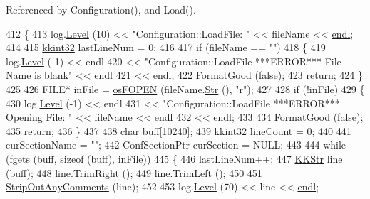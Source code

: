 Referenced by Configuration(), and Load().


\begin{DoxyCode}
412 \{
413   log.\hyperlink{class_k_k_b_1_1_run_log_a32cf761d7f2e747465fd80533fdbb659}{Level} (10) << \textcolor{stringliteral}{"Configuration::LoadFile: "} << fileName << \hyperlink{namespace_k_k_b_ad1f50f65af6adc8fa9e6f62d007818a8}{endl};
414 
415   \hyperlink{namespace_k_k_b_a8fa4952cc84fda1de4bec1fbdd8d5b1b}{kkint32}  lastLineNum = 0;
416 
417   \textcolor{keywordflow}{if}  (fileName == \textcolor{stringliteral}{""})
418   \{
419     log.\hyperlink{class_k_k_b_1_1_run_log_a32cf761d7f2e747465fd80533fdbb659}{Level} (-1) << endl
420                    << \textcolor{stringliteral}{"Configuration::LoadFile   ***ERROR***   File-Name is blank"}  << endl
421                    << \hyperlink{namespace_k_k_b_ad1f50f65af6adc8fa9e6f62d007818a8}{endl};
422     \hyperlink{class_k_k_b_1_1_configuration_a83da17732beb6179d42f73f699795b68}{FormatGood} (\textcolor{keyword}{false});
423     \textcolor{keywordflow}{return};
424   \}
425 
426   FILE*  inFile = \hyperlink{namespace_k_k_b_abf4050d2916ded8349dafadc80f0ecd1}{osFOPEN} (fileName.\hyperlink{class_k_k_b_1_1_k_k_str_ad574e6c0fe7f6ce1ba3ab0a8ce2fbd52}{Str} (), \textcolor{stringliteral}{"r"});
427 
428   \textcolor{keywordflow}{if}  (!inFile)
429   \{
430     log.\hyperlink{class_k_k_b_1_1_run_log_a32cf761d7f2e747465fd80533fdbb659}{Level} (-1) << endl
431                    << \textcolor{stringliteral}{"Configuration::LoadFile   ***ERROR***    Opening File: "} << fileName << endl
432                    << \hyperlink{namespace_k_k_b_ad1f50f65af6adc8fa9e6f62d007818a8}{endl};
433 
434     \hyperlink{class_k_k_b_1_1_configuration_a83da17732beb6179d42f73f699795b68}{FormatGood} (\textcolor{keyword}{false});
435     \textcolor{keywordflow}{return};
436   \}
437 
438   \textcolor{keywordtype}{char}  buff[10240];
439   \hyperlink{namespace_k_k_b_a8fa4952cc84fda1de4bec1fbdd8d5b1b}{kkint32} lineCount = 0;
440 
441   curSectionName = \textcolor{stringliteral}{""};
442   ConfSectionPtr  curSection = NULL;
443 
444   \textcolor{keywordflow}{while}  (fgets (buff, \textcolor{keyword}{sizeof} (buff), inFile))
445   \{
446     lastLineNum++;
447     \hyperlink{class_k_k_b_1_1_k_k_str}{KKStr}  line (buff);
448     line.TrimRight ();
449     line.TrimLeft ();
450 
451     \hyperlink{_configuration_8cpp_a65029dc58121c93c0ecd83d9809d077a}{StripOutAnyComments} (line);
452 
453     log.\hyperlink{class_k_k_b_1_1_run_log_a32cf761d7f2e747465fd80533fdbb659}{Level} (70) << line << \hyperlink{namespace_k_k_b_ad1f50f65af6adc8fa9e6f62d007818a8}{endl};

\end{DoxyCode}
